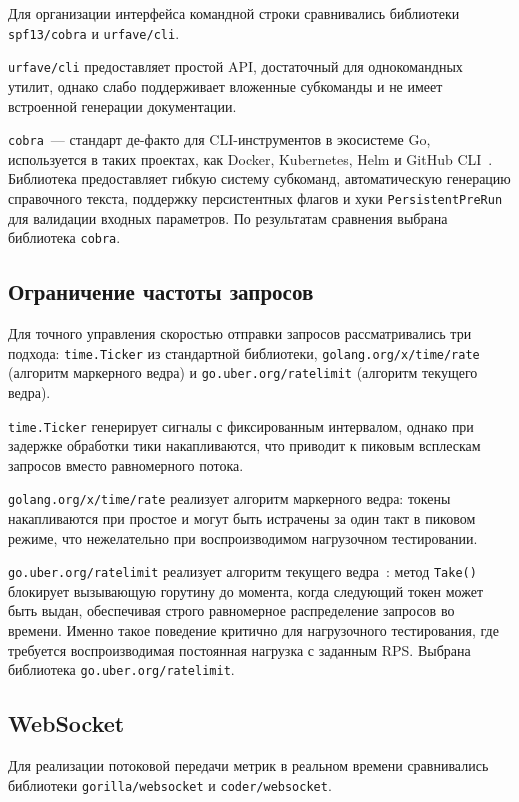 Для организации интерфейса командной строки сравнивались библиотеки
\texttt{spf13/cobra} и \texttt{urfave/cli}.

\texttt{urfave/cli} предоставляет простой API, достаточный для однокомандных утилит,
однако слабо поддерживает вложенные субкоманды и не имеет встроенной
генерации документации.

\texttt{cobra}~--- стандарт де-факто для CLI-инструментов в экосистеме Go,
используется в таких проектах, как Docker, Kubernetes, Helm и GitHub CLI~\cite{cobra}.
Библиотека предоставляет гибкую систему субкоманд, автоматическую генерацию
справочного текста, поддержку персистентных флагов и хуки \texttt{PersistentPreRun}
для валидации входных параметров.
По результатам сравнения выбрана библиотека \texttt{cobra}.

\subsection*{Ограничение частоты запросов}

Для точного управления скоростью отправки запросов рассматривались три подхода:
\texttt{time.Ticker} из стандартной библиотеки, \texttt{golang.org/x/time/rate}
(алгоритм маркерного ведра) и \texttt{go.uber.org/ratelimit} (алгоритм текущего ведра).

\texttt{time.Ticker} генерирует сигналы с фиксированным интервалом, однако при задержке
обработки тики накапливаются, что приводит к пиковым всплескам запросов
вместо равномерного потока.

\texttt{golang.org/x/time/rate} реализует алгоритм маркерного ведра: токены накапливаются
при простое и могут быть истрачены за один такт в пиковом режиме, что нежелательно
при воспроизводимом нагрузочном тестировании.

\texttt{go.uber.org/ratelimit} реализует алгоритм текущего ведра~\cite{ratelimit}:
метод \texttt{Take()} блокирует вызывающую горутину до момента, когда следующий
токен может быть выдан, обеспечивая строго равномерное распределение запросов
во времени.
Именно такое поведение критично для нагрузочного тестирования, где требуется
воспроизводимая постоянная нагрузка с заданным RPS.
Выбрана библиотека \texttt{go.uber.org/ratelimit}.

\subsection*{WebSocket}

Для реализации потоковой передачи метрик в реальном времени сравнивались
библиотеки \texttt{gorilla/websocket} и \texttt{coder/websocket}.

